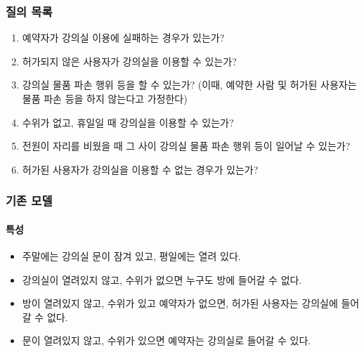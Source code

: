 \documentclass[11pt,a4paper]{article}
\begin{document}
\subsubsection{질의 목록}
\begin{enumerate}
\item 예약자가 강의실 이용에 실패하는 경우가 있는가?
\item 허가되지 않은 사용자가 강의실을 이용할 수 있는가?
\item 강의실 물품 파손 행위 등을 할 수 있는가? (이때, 예약한 사람 및 허가된 사용자는 물품 파손 등을 하지 않는다고 가정한다)
\item 수위가 없고, 휴일일 때 강의실을 이용할 수 있는가?
\item 전원이 자리를 비웠을 때 그 사이 강의실 물품 파손 행위 등이 일어날 수 있는가?
\item 허가된 사용자가 강의실을 이용할 수 없는 경우가 있는가?
\end{enumerate}

\subsubsection{기존 모델}

\paragraph{특성}
\begin{itemize}
\item 주말에는 강의실 문이 잠겨 있고, 평일에는 열려 있다.
\item 강의실이 열려있지 않고, 수위가 없으면 누구도 방에 들어갈 수 없다.
\item 방이 열려있지 않고, 수위가 있고 예약자가 없으면, 허가된 사용자는 강의실에 들어갈 수 없다.
\item 문이 열려있지 않고, 수위가 있으면 예약자는 강의실로 들어갈 수 있다.
\end{itemize}
\end{document}
